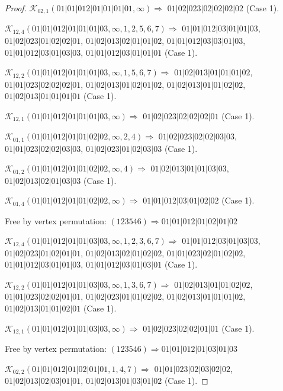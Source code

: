 \documentclass[12pt]{article}
\theoremstyle{plain}
\theoremstyle{definition}
\theoremstyle{remark}
\newcommand{\fancy}[1]{\mathcal{#1}}
\def\K{\fancy{K}}
\begin{document}
\begin{proof}
	$\K_{02,1}(01|01|012|01|01|01|01,\infty)\Rightarrow $ $01|02|023|02|02|02|02$ (Case 1).
	
	
	\bigskip
	
	$\K_{12,4}(01|01|012|01|01|01|03,\infty,1, 2, 5, 6, 7)\Rightarrow $ $01|01|012|03|01|01|03$, $01|02|023|01|02|02|01$, $01|02|013|02|01|01|02$, $01|01|012|03|03|01|03$, $01|01|012|03|01|03|03$, $01|01|012|03|01|01|01$ (Case 1).
	
	$\K_{12,2}(01|01|012|01|01|01|03,\infty,1, 5, 6, 7)\Rightarrow $ $01|02|013|01|01|01|02$, $01|01|023|02|02|02|01$, $01|02|013|01|02|01|02$, $01|02|013|01|01|02|02$, $01|02|013|01|01|01|01$ (Case 1).
	
	$\K_{12,1}(01|01|012|01|01|01|03,\infty)\Rightarrow $ $01|02|023|02|02|02|01$ (Case 1).
	
	
	\bigskip
	
	$\K_{01,1}(01|01|012|01|01|02|02,\infty,2, 4)\Rightarrow $ $01|02|023|02|02|03|03$, $01|01|023|02|02|03|03$, $01|02|023|01|02|03|03$ (Case 1).
	
	$\K_{01,2}(01|01|012|01|01|02|02,\infty,4)\Rightarrow $ $01|02|013|01|01|03|03$, $01|02|013|02|01|03|03$ (Case 1).
	
	$\K_{01,4}(01|01|012|01|01|02|02,\infty)\Rightarrow $ $01|01|012|03|01|02|02$ (Case 1).
	
	
	
	Free by vertex permutation: $(1 2 3 5 4 6)\Rightarrow 01|01|012|01|02|01|02$
	
	
	
	\bigskip
	
	$\K_{12,4}(01|01|012|01|01|03|03,\infty,1, 2, 3, 6, 7)\Rightarrow $ $01|01|012|03|01|03|03$, $01|02|023|01|02|01|01$, $01|02|013|02|01|02|02$, $01|01|023|02|01|02|02$, $01|01|012|03|01|01|03$, $01|01|012|03|01|03|01$ (Case 1).
	
	$\K_{12,2}(01|01|012|01|01|03|03,\infty,1, 3, 6, 7)\Rightarrow $ $01|02|013|01|01|02|02$, $01|01|023|02|02|01|01$, $01|02|023|01|01|02|02$, $01|02|013|01|01|01|02$, $01|02|013|01|01|02|01$ (Case 1).
	
	$\K_{12,1}(01|01|012|01|01|03|03,\infty)\Rightarrow $ $01|02|023|02|02|01|01$ (Case 1).
	
	
	
	Free by vertex permutation: $(1 2 3 5 4 6)\Rightarrow 01|01|012|01|03|01|03$
	
	
	
	\bigskip
	
	$\K_{02,2}(01|01|012|01|02|01|01,1, 4, 7)\Rightarrow $ $01|01|023|02|03|02|02$, $01|02|013|02|03|01|01$, $01|02|013|01|03|01|02$ (Case 1).
	

\end{proof}
\end{document}
